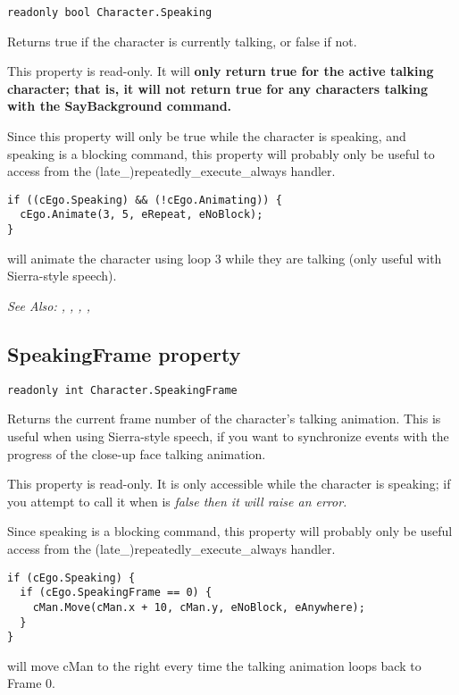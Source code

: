 \begin{verbatim}
readonly bool Character.Speaking
\end{verbatim}
Returns true if the character is currently talking, or false if not.

This property is read-only. It will \bf{only} return true for the active talking character;
that is, it will not return true for any characters talking with the SayBackground command.

Since this property will only be true while the character is speaking, and speaking is
a blocking command, this property will probably only be useful to access from
the (late_)repeatedly_execute_always handler.

\begin{verbatim}
if ((cEgo.Speaking) && (!cEgo.Animating)) {
  cEgo.Animate(3, 5, eRepeat, eNoBlock);
}
\end{verbatim}
will animate the character using loop 3 while they are talking (only useful with Sierra-style speech).

\it{See Also:} ,
,
,
,


\subsection{SpeakingFrame property}\label{Character.SpeakingFrame}%

\begin{verbatim}
readonly int Character.SpeakingFrame
\end{verbatim}
Returns the current frame number of the character's talking animation. This is
useful when using Sierra-style speech, if you want to synchronize events with the
progress of the close-up face talking animation.

This property is read-only. It is only accessible while the character is speaking;
if you attempt to call it when  is
\it{false} then it will raise an error.

Since speaking is a blocking command, this property will probably only be useful
access from the (late_)repeatedly_execute_always handler.

\begin{verbatim}
if (cEgo.Speaking) {
  if (cEgo.SpeakingFrame == 0) {
    cMan.Move(cMan.x + 10, cMan.y, eNoBlock, eAnywhere);
  }
}
\end{verbatim}
will move cMan to the right every time the talking animation loops back to Frame 0.

